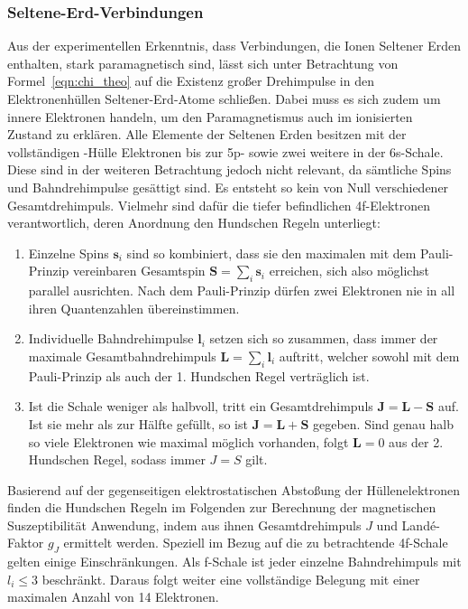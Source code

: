 \subsubsection{Seltene-Erd-Verbindungen}

Aus der experimentellen Erkenntnis, dass Verbindungen, die Ionen Seltener Erden enthalten, stark paramagnetisch sind, lässt sich
unter Betrachtung von Formel~\eqref{eqn:chi_theo} auf die Existenz großer Drehimpulse in den Elektronenhüllen Seltener-Erd-Atome
schließen. Dabei muss es sich zudem um innere Elektronen handeln, um den Paramagnetismus auch im ionisierten Zustand zu erklären.
Alle Elemente der Seltenen Erden besitzen mit der vollständigen -Hülle Elektronen bis zur 5p- sowie zwei weitere in der
6s-Schale. Diese sind in der weiteren Betrachtung jedoch nicht relevant, da sämtliche Spins und Bahndrehimpulse gesättigt sind.
Es entsteht so kein von Null verschiedener Gesamtdrehimpuls. Vielmehr sind dafür die tiefer befindlichen 4f-Elektronen
verantwortlich, deren Anordnung den Hundschen Regeln unterliegt:
\begin{enumerate}
	\item Einzelne Spins $\symbf s_i$ sind so kombiniert, dass sie den maximalen mit dem Pauli-Prinzip vereinbaren Gesamtspin
			$\symbf S = \sum_i \symbf s_i$ erreichen, sich also möglichst parallel ausrichten. Nach dem Pauli-Prinzip dürfen
			zwei Elektronen nie in all ihren Quantenzahlen übereinstimmen.
	\item Individuelle Bahndrehimpulse $\symbf l_i$ setzen sich so zusammen, dass immer der maximale Gesamtbahndrehimpuls
			$\symbf L = \sum_i \symbf l_i$ auftritt, welcher sowohl mit dem Pauli-Prinzip als auch der 1. Hundschen Regel verträglich ist.
	\item Ist die Schale weniger als halbvoll, tritt ein Gesamtdrehimpuls $\symbf J = \symbf L - \symbf S$ auf. Ist sie mehr als zur
			Hälfte gefüllt, so ist $\symbf J = \symbf L + \symbf S$ gegeben. Sind genau halb so viele Elektronen wie maximal
			möglich vorhanden, folgt $\symbf L = 0$ aus der 2. Hundschen Regel, sodass immer $J = S$ gilt.	
\end{enumerate}
Basierend auf der gegenseitigen elektrostatischen Abstoßung der Hüllenelektronen finden die Hundschen Regeln im Folgenden zur
Berechnung der magnetischen Suszeptibilität Anwendung, indem aus ihnen Gesamtdrehimpuls $J$ und Landé-Faktor $g_J$ ermittelt werden.
Speziell im Bezug auf die zu betrachtende 4f-Schale gelten einige Einschränkungen. Als f-Schale ist jeder einzelne Bahndrehimpuls
mit $l_i \leq 3$ beschränkt. Daraus folgt weiter eine vollständige Belegung mit einer maximalen Anzahl von 14 Elektronen.


